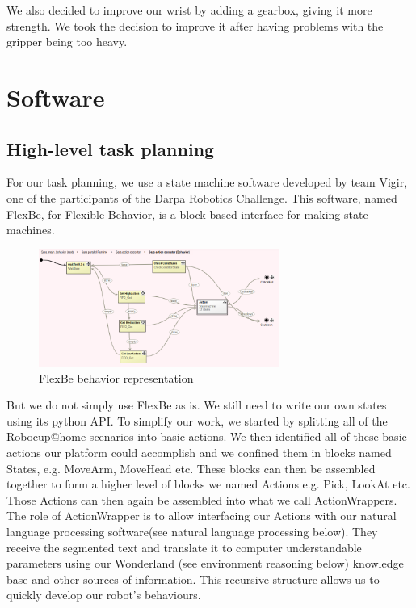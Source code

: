 \documentclass[runningheads,a4paper]{llncs}
\begin{document}
We also decided to improve our wrist by adding a gearbox, giving it more strength. We took the decision to improve it after having problems with the gripper being too heavy.  

\newpage
\section{Software}

\subsection{High-level task planning}
\tab For our task planning, we use a state machine software developed by team Vigir, one of the participants of the Darpa Robotics Challenge. This software, named \href{http://philserver.bplaced.net/fbe/index.php}{FlexBe}\cite{schillinger2016flexbe}, for Flexible Behavior, is a block-based interface for making state machines.\\

\begin{figure}[h!]
	\centering
	\includegraphics[width=0.70\textwidth]{images/flexbe.png}
	\caption{FlexBe behavior representation}
\end{figure}

But we do not simply use FlexBe as is. We still need to write our own states using its python API. To simplify our work, we started by splitting all of the Robocup@home scenarios into basic actions. We then identified all of these basic actions our platform could accomplish and we confined them in blocks named States, e.g. MoveArm, MoveHead etc. These blocks can then be assembled together to form a higher level of blocks we named Actions e.g. Pick, LookAt etc. Those Actions can then again be assembled into what we call ActionWrappers. The role of ActionWrapper is to allow interfacing our Actions with our natural language processing software(see natural language processing below). They receive the segmented text and translate it to computer understandable parameters using our Wonderland (see environment reasoning below) knowledge base and other sources of information. This recursive structure allows us to quickly develop our robot’s behaviours.\\
\end{document}

